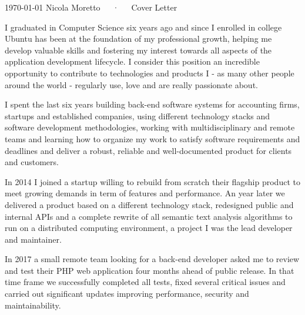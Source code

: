 \documentclass[11pt, a4paper]{awesome-cv}
\begin{document}
\makecvheader[R]

\makecvfooter
  {\today}
  {Nicola Moretto~~~·~~~Cover Letter}
  {}

\makelettertitle

\begin{cvletter}



I graduated in Computer Science six years ago and since I enrolled in college Ubuntu has been at the foundation of my professional growth, helping me develop valuable skills and fostering my interest towards all aspects of the application development lifecycle. I consider this position an incredible opportunity to contribute to technologies and products I - as many other people around the world - regularly use, love and are really passionate about.

I spent the last six years building back-end software systems for accounting firms, startups and established companies, using different technology stacks and software development methodologies, working with multidisciplinary and remote teams and learning how to organize my work to satisfy software requirements and deadlines and deliver a robust, reliable and well-documented product for clients and customers.

In 2014 I joined a startup willing to rebuild from scratch their flagship product to meet growing demands in term of features and performance. An year later we delivered a product based on a different technology stack, redesigned public and internal APIs and a complete rewrite of all semantic text analysis algorithms to run on a distributed computing environment, a project I was the lead developer and maintainer.

In 2017 a small remote team looking for a back-end developer asked me to review and test their PHP web application four months ahead of public release. In that time frame we successfully completed all tests, fixed several critical issues and carried out significant updates improving performance, security and maintainability.


\end{cvletter}
\end{document}
